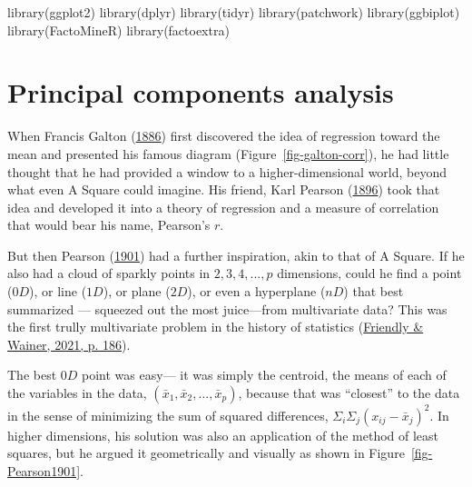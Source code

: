 \documentclass[
  letterpaper,
  10pt,
  krantz2]{krantz}
\makeatletter
\newenvironment{Shaded}{\begin{snugshade}}{\end{snugshade}}
\newcommand{\FunctionTok}[1]{\textcolor[rgb]{0.28,0.35,0.67}{#1}}
\newcommand{\NormalTok}[1]{\textcolor[rgb]{0.00,0.23,0.31}{#1}}
\newenvironment{kframe}{%
  \medskip{}
  \setlength{\fboxsep}{.8em}
  \def\at@end@of@kframe{}%
  \ifinner\ifhmode%
  \def\at@end@of@kframe{\end{minipage}}%
  \begin{minipage}{\columnwidth}%
  \fi\fi%
  \def\FrameCommand##1{\hskip\@totalleftmargin \hskip-\fboxsep
  \colorbox{shadecolor}{##1}\hskip-\fboxsep
      \hskip-\linewidth \hskip-\@totalleftmargin \hskip\columnwidth}%
  \MakeFramed {\advance\hsize-\width
    \@totalleftmargin\z@ \linewidth\hsize
    \@setminipage}}%
{\par\unskip\endMakeFramed%
  \at@end@of@kframe}
\renewenvironment{Shaded}{\begin{kframe}}{\end{kframe}}
\makeatother
\begin{document}
\begin{Shaded}
\begin{Highlighting}[]
\FunctionTok{library}\NormalTok{(ggplot2)}
\FunctionTok{library}\NormalTok{(dplyr)}
\FunctionTok{library}\NormalTok{(tidyr)}
\FunctionTok{library}\NormalTok{(patchwork)}
\FunctionTok{library}\NormalTok{(ggbiplot)}
\FunctionTok{library}\NormalTok{(FactoMineR)}
\FunctionTok{library}\NormalTok{(factoextra)}
\end{Highlighting}
\end{Shaded}

\hypertarget{sec-pca}{%
\section{Principal components analysis}\label{sec-pca}}

When Francis Galton (\protect\hyperlink{ref-Galton:1886}{1886}) first
discovered the idea of regression toward the mean and presented his
famous diagram (Figure~\ref{fig-galton-corr}), he had little thought
that he had provided a window to a higher-dimensional world, beyond what
even A Square could imagine. His friend, Karl Pearson
(\protect\hyperlink{ref-Pearson:1896}{1896}) took that idea and
developed it into a theory of regression and a measure of correlation
that would bear his name, Pearson's \(r\).

But then Pearson (\protect\hyperlink{ref-Pearson:1901}{1901}) had a
further inspiration, akin to that of A Square. If he also had a cloud of
sparkly points in \(2, 3, 4, ..., p\) dimensions, could he find a point
(\(0D\)), or line (\(1D\)), or plane (\(2D\)), or even a hyperplane
(\(nD\)) that best summarized --- squeezed out the most juice---from
multivariate data? This was the first trully multivariate problem in the
history of statistics
(\protect\hyperlink{ref-FriendlyWainer:2021:TOGS}{Friendly \& Wainer,
2021, p. 186}).

The best \(0D\) point was easy--- it was simply the centroid, the means
of each of the variables in the data,
\((\bar{x}_1, \bar{x}_2, ..., \bar{x}_p)\), because that was ``closest''
to the data in the sense of minimizing the sum of squared differences,
\(\Sigma_i\Sigma_j (x_{ij} - \bar{x}_j)^2\). In higher dimensions, his
solution was also an application of the method of least squares, but he
argued it geometrically and visually as shown in
Figure~\ref{fig-Pearson1901}.
\end{document}
